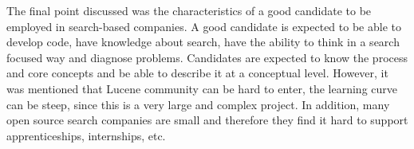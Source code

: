The final point discussed was the characteristics of a good candidate to be employed in search-based companies.
A good candidate is expected to be able to develop code, have knowledge about search, have the ability to think in a search focused way and diagnose problems.
Candidates are expected to know the process and core concepts and be able to describe it at a conceptual level.  
However, it was mentioned that Lucene community can be hard to enter, the learning curve can be steep, since this is a very large and complex project. 
In addition, many open source search companies are small and therefore they find it hard to support apprenticeships, internships, etc. 

